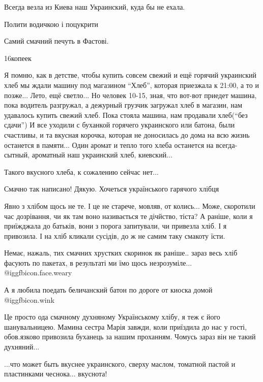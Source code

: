 \begin{itemize}
Всегда везла из Киева наш Украинский, куда бы не ехала.

Полити водичкою і поцукрити

Самий смачний печуть в Фастові.

16копеек

Я помню, как в детстве, чтобы купить совсем свежий и ещё горячий украинский
хлеб мы ждали машину под магазином \enquote{Хлеб}, которая приезжала к 21:00, а то и
позже... Лето, ещё светло... Но человек 10-15, зная, что вот-вот приедет
машина, пока водитель разгружал, а дежурный грузчик загружал хлеб в магазин, нам
удавалось купить свежий хлеб. Пока стояла машина, нам продавали хлеб(\enquote{без
сдачи}) И все уходили с буханкой горячего украинского или батона, были
счастливы, и та вкусная корочка, которая не доносилась до дома на всю жизнь
останется в памяти... Один аромат и тепло того хлеба останется на
всегда-сытный, ароматный наш украинский хлеб, киевский...

Такого вкусного хлеба, к сожалению сейчас нет...


Смачно так написано! Дякую. Хочеться українського гарячого хлібця


Явно з хлібом щось не те. І це не старече, мовляв, от колись... Може, скоротили
час дозрівання, чи як там воно називається те дічйство, тіста? А раніше, коли я
приїжджала до батьків, вони з порога запитували, чи привезла хліб. І я
привозила. І на хліб кликали сусідів, до ж не самим таку смакоту їсти.



Немає, нажаль, тих смачних хрустких скоринок як раніше.. зараз весь хліб
фасують по пакетах, в результаті ми їмо щось незрозуміле... @igg{fbicon.face.weary} 


А я любила поедать беличанский батон по дороге от киоска домой  @igg{fbicon.wink} 


Це просто ода смачному духняному Українському хлібу, я теж є його
шанувальницею. Мамина сестра Марія завжди, коли приїздила до нас у гості,
обов.язково привозила буханець за нашим проханням. Чомусь зараз він не такий
духняний...


...что может быть вкуснее украинского, сверху маслом, томатной пастой и пластинками чеснока... вкуснота!


\end{itemize}
